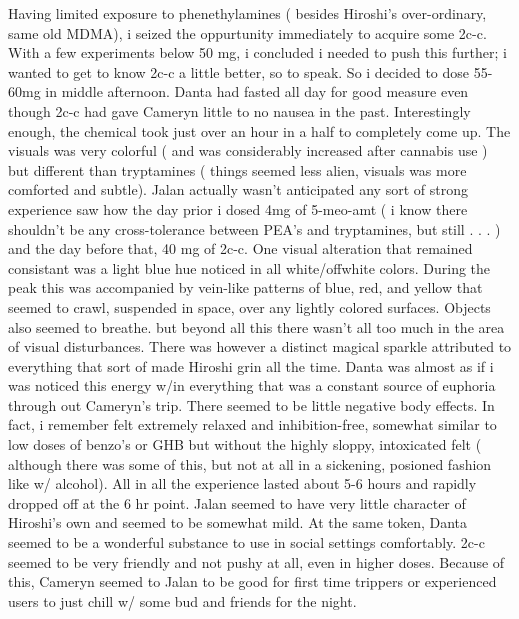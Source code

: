 \documentclass[12pt]{book}
\begin{document}
Having limited exposure to phenethylamines ( besides Hiroshi's over-ordinary, same old MDMA), i seized the oppurtunity immediately to acquire some 2c-c. With a few experiments below 50 mg, i concluded i needed to push this further; i wanted to get to know 2c-c a little better, so to speak. So i decided to dose 55-60mg in middle afternoon. Danta had fasted all day for good measure even though 2c-c had gave Cameryn little to no nausea in the past. Interestingly enough, the chemical took just over an hour in a half to completely come up. The visuals was very colorful ( and was considerably increased after cannabis use ) but different than tryptamines ( things seemed less alien, visuals was more comforted and subtle). Jalan actually wasn't anticipated any sort of strong experience saw how the day prior i dosed 4mg of 5-meo-amt ( i know there shouldn't be any cross-tolerance between PEA's and tryptamines, but still . . .   ) and the day before that, 40 mg of 2c-c. One visual alteration that remained consistant was a light blue hue noticed in all white/offwhite colors. During the peak this was accompanied by vein-like patterns of blue, red, and yellow that seemed to crawl, suspended in space, over any lightly colored surfaces. Objects also seemed to breathe. but beyond all this there wasn't all too much in the area of visual disturbances. There was however a distinct magical sparkle attributed to everything that sort of made Hiroshi grin all the time. Danta was almost as if i was noticed this energy w/in everything that was a constant source of euphoria through out Cameryn's trip. There seemed to be little negative body effects. In fact, i remember felt extremely relaxed and inhibition-free, somewhat similar to low doses of benzo's or GHB but without the highly sloppy, intoxicated felt ( although there was some of this, but not at all in a sickening, posioned fashion like w/ alcohol). All in all the experience lasted about 5-6 hours and rapidly dropped off at the 6 hr point. Jalan seemed to have very little character of Hiroshi's own and seemed to be somewhat mild. At the same token, Danta seemed to be a wonderful substance to use in social settings comfortably. 2c-c seemed to be very friendly and not pushy at all, even in higher doses. Because of this, Cameryn seemed to Jalan to be good for first time trippers or experienced users to just chill w/ some bud and friends for the night.
\end{document}
